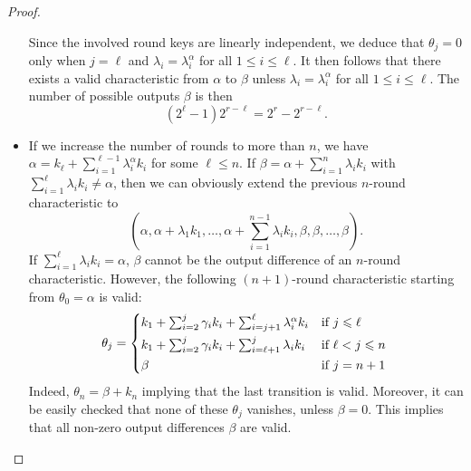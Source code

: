 \begin{proof}
\begin{itemize}
          Since the involved round keys are linearly independent, we deduce that $\theta_j=0$ only when $j=\ell$ and $\lambda_i = \lambda_i^\alpha$ for all $1 \leqslant i \leqslant \ell$.
          It then follows that there exists a valid characteristic from $\alpha$ to $\beta$ unless $\lambda_i = \lambda_i^\alpha$ for all $1 \leqslant i \leqslant \ell$.
          The number of possible outputs $\beta$ is then
          \begin{equation*}
              (2^\ell-1)2^{r-\ell}= 2^r - 2^{r-\ell}.
          \end{equation*}
    \item If we increase the number of rounds to more than $n$, we have $\alpha = k_\ell + \sum_{i=1}^{\ell-1} \lambda_i^\alpha k_i$ for some $\ell \leqslant n$.
          If $\beta = \alpha + \sum_{i=1}^n \lambda_i k_i$ with $\sum_{i=1}^\ell \lambda_i k_i \neq \alpha$, then we can obviously extend the previous $n$-round characteristic to
          \begin{equation*}
              (\alpha, \alpha+\lambda_1 k_1, \ldots, \alpha + \sum_{i=1}^{n-1}\lambda_i k_i, \beta, \beta, \ldots, \beta).
          \end{equation*}
          If $\sum_{i=1}^\ell \lambda_i k_i = \alpha$, $\beta$ cannot be the output difference of an $n$-round characteristic.
          However, the following $(n+1)$-round characteristic starting from $\theta_0=\alpha$ is valid:
          \begin{equation*}
              \theta_j = \begin{cases*}
                k_1 + \sum_{i=2}^j \gamma_i k_i + \sum_{i=j+1}^\ell \lambda_i^\alpha k_i & if $j \leqslant \ell$\\
                k_1 + \sum_{i=2}^j \gamma_i k_i + \sum_{i=\ell+1}^j \lambda_i k_i & if $\ell < j \leqslant n$\\
                \beta & if $j=n+1$
              \end{cases*}
          \end{equation*}
          Indeed, $\theta_n = \beta+k_n$ implying that the last transition is valid.
          Moreover, it can be easily checked that none of these $\theta_j$ vanishes, unless $\beta=0$.
          This implies that all non-zero output differences $\beta$ are valid.
\end{itemize}
\vspace{-1.5\baselineskip}
\end{proof}


